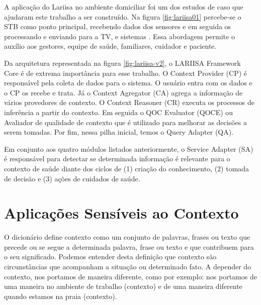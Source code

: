 A aplicação do Lariisa no ambiente domiciliar foi um dos estudos de caso que ajudaram
este trabalho a ser construído. Na figura \ref{fig:lariisa01} percebe-se o STB como 
ponto principal, recebendo dados dos sensores e em seguida os processando e enviando
para a TV, \smartphones[] e sistemas \web. Essa abordagem permite o auxílio aos
gestores, equipe de saúde, familiares, cuidador e paciente.


Da arquitetura representada na figura \ref{fig:lariisa-v2}, o LARIISA Framework
Core é de extrema importância para esse trabalho. O Context Provider (CP) é
responsável pela coleta de dados para o sistema. O usuário entra com os dados
e o CP os recebe e trata. Já o Context Agregator (CA) agrega a informação de
vários provedores de contexto. O Context Reasoner (CR) executa os processos de
inferência a partir do contexto. Em seguida o QOC Evaluator (QOCE) ou Avaliador
de qualidade de contexto que é utilizado para melhorar as decisões a serem
tomadas. Por fim, nessa pilha inicial, temos o Query Adapter (QA).

Em conjunto aos quatro módulos listados anteriormente, o Service Adapter (SA) é
responsável para detectar se determinada informação é relevante para o contexto
de saúde diante dos ciclos de (1) criação do conhecimento, (2) tomada de
decisão e (3) ações de cuidados de saúde.

\section{Aplicações Sensíveis ao Contexto}\label{sec:contexto}

O dicionário  define contexto como um conjunto de palavras, frases ou
texto que precede ou se segue a determinada palavra, frase ou texto e que
contribuem para o seu significado. Podemos entender desta definição que contexto
são circunstâncias que acompanham a situação ou determinado fato. A depender do
contexto, nos portamos de maneira diferente, como por exemplo: nos portamos de
uma maneira no ambiente de trabalho (contexto) e de uma maneira diferente quando
estamos na praia (contexto).


